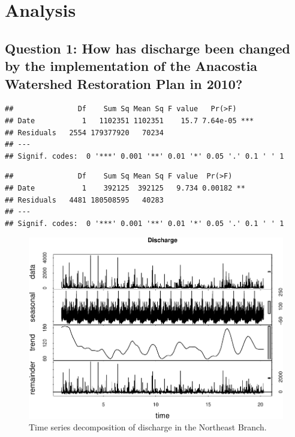 \documentclass[
  12pt,
]{article}
\begin{document}
\newpage

\hypertarget{analysis}{%
\section{Analysis}\label{analysis}}

\hypertarget{question-1-how-has-discharge-been-changed-by-the-implementation-of-the-anacostia-watershed-restoration-plan-in-2010}{%
\subsection{Question 1: How has discharge been changed by the
implementation of the Anacostia Watershed Restoration Plan in
2010?}\label{question-1-how-has-discharge-been-changed-by-the-implementation-of-the-anacostia-watershed-restoration-plan-in-2010}}

\begin{verbatim}
##               Df    Sum Sq Mean Sq F value   Pr(>F)    
## Date           1   1102351 1102351    15.7 7.64e-05 ***
## Residuals   2554 179377920   70234                     
## ---
## Signif. codes:  0 '***' 0.001 '**' 0.01 '*' 0.05 '.' 0.1 ' ' 1
\end{verbatim}

\begin{verbatim}
##               Df    Sum Sq Mean Sq F value  Pr(>F)   
## Date           1    392125  392125   9.734 0.00182 **
## Residuals   4481 180508595   40283                   
## ---
## Signif. codes:  0 '***' 0.001 '**' 0.01 '*' 0.05 '.' 0.1 ' ' 1
\end{verbatim}

\begin{figure}

\includegraphics{Project_Template_files/figure-latex/Plot of Discharge Time Series Decomposition-1} \hfill{}

\caption{Time series decomposition of discharge in the Northeast Branch.}\label{fig:Plot of Discharge Time Series Decomposition}
\end{figure}
\end{document}
